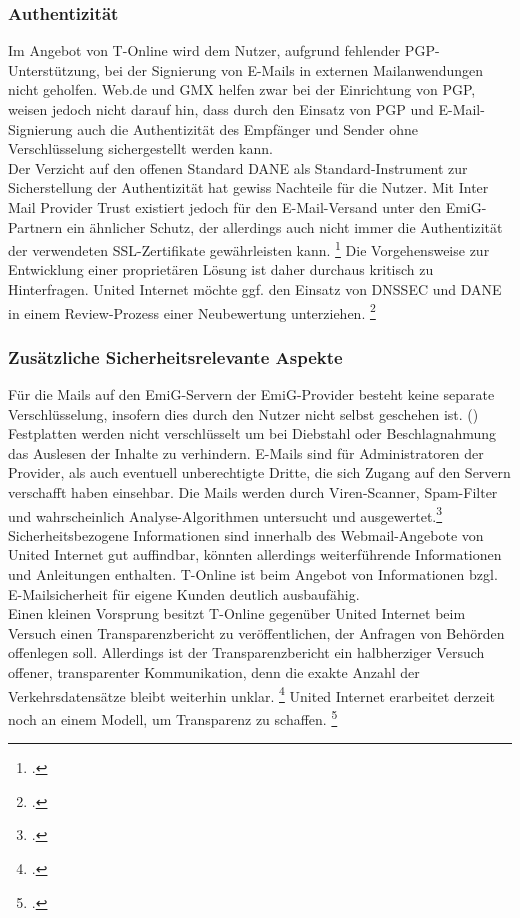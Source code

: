 \documentclass  [paper=a4,
				fontsize=12pt,
				listof=totoc,
				bibliography=totoc
				]{scrreprt}
\begin{document}
		\subsubsection{Authentizität}
		\label{subsubsec:emig-auth}	
			Im Angebot von T-Online wird dem Nutzer, aufgrund fehlender PGP-Unterstützung, bei der Signierung von E-Mails in externen Mailanwendungen nicht geholfen. 
			Web.de und GMX helfen zwar bei der Einrichtung von PGP, weisen jedoch nicht darauf hin, dass durch den Einsatz von PGP und E-Mail-Signierung auch die Authentizität des Empfänger und Sender ohne Verschlüsselung sichergestellt werden kann. \\
			Der Verzicht auf den offenen Standard DANE als Standard-Instrument zur Sicherstellung der Authentizität hat gewiss Nachteile für die Nutzer. 
			Mit Inter Mail Provider Trust existiert jedoch für den E-Mail-Versand unter den EmiG-Partnern ein ähnlicher Schutz, der allerdings auch nicht immer die Authentizität der verwendeten SSL-Zertifikate gewährleisten kann.
			\footcite[Vgl.][]{Zivadino14-1}
			Die Vorgehensweise zur Entwicklung einer proprietären Lösung ist daher durchaus kritisch zu Hinterfragen. 
			United Internet möchte ggf. den Einsatz von DNSSEC und DANE in einem Review-Prozess einer Neubewertung unterziehen.
			\footcite[Vgl.][]{Zivadino14-2}
		\subsubsection{Zusätzliche Sicherheitsrelevante Aspekte}
			Für die Mails auf den EmiG-Servern der EmiG-Provider besteht keine separate Verschlüsselung, insofern dies durch den Nutzer nicht selbst geschehen ist. ()
			Festplatten werden nicht verschlüsselt um bei Diebstahl oder Beschlagnahmung das Auslesen der Inhalte zu verhindern.
			E-Mails sind für Administratoren der Provider, als auch eventuell unberechtigte Dritte, die sich Zugang auf den Servern verschafft haben einsehbar. 
			Die Mails werden durch Viren-Scanner, Spam-Filter und wahrscheinlich Analyse-Algorithmen untersucht und ausgewertet.\footcite[Vgl.][]{Kurz13}
			Sicherheitsbezogene Informationen sind innerhalb des Webmail-Angebote von United Internet gut auffindbar, könnten allerdings weiterführende Informationen und Anleitungen enthalten.
			T-Online ist beim Angebot von Informationen bzgl. E-Mailsicherheit für eigene Kunden deutlich ausbaufähig.\\
			Einen kleinen Vorsprung besitzt T-Online gegenüber United Internet beim Versuch einen Transparenzbericht zu veröffentlichen, der Anfragen von Behörden offenlegen soll.
			Allerdings ist der Transparenzbericht ein halbherziger Versuch offener, transparenter Kommunikation, denn  die exakte Anzahl der Verkehrsdatensätze bleibt weiterhin unklar.
			\footcite[Vgl.][]{Beuth14}
			United Internet erarbeitet derzeit noch an einem Modell, um Transparenz zu schaffen.
			\footcite[Vgl.][]{Boehm14}
\end{document}

